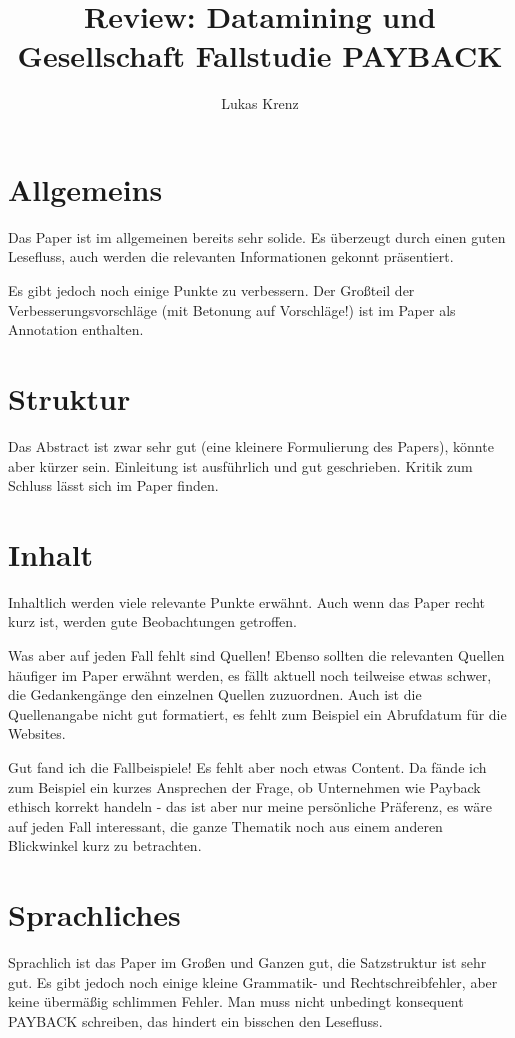 \documentclass{article}
\begin{document}
\title{Review: Datamining und Gesellschaft Fallstudie PAYBACK}
\author{Lukas Krenz}

\maketitle

\section{Allgemeins}
Das Paper ist im allgemeinen bereits sehr solide. Es überzeugt durch einen guten Lesefluss, auch werden die relevanten Informationen gekonnt präsentiert.

Es gibt jedoch noch einige Punkte zu verbessern. Der Großteil der Verbesserungsvorschläge (mit Betonung auf Vorschläge!) ist im Paper als Annotation enthalten.

\section{Struktur}
Das Abstract ist zwar sehr gut (eine kleinere Formulierung des Papers), könnte aber kürzer sein.
Einleitung ist ausführlich und gut geschrieben.
Kritik zum Schluss lässt sich im Paper finden.

\section{Inhalt}
Inhaltlich werden viele relevante Punkte erwähnt. Auch wenn das Paper recht kurz ist, werden gute Beobachtungen getroffen.

Was aber auf jeden Fall fehlt sind Quellen! Ebenso sollten die relevanten Quellen häufiger im Paper erwähnt werden, es fällt aktuell noch teilweise etwas schwer, die Gedankengänge den einzelnen Quellen zuzuordnen. Auch ist die Quellenangabe nicht gut formatiert, es fehlt zum Beispiel ein Abrufdatum für die Websites.

Gut fand ich die Fallbeispiele! Es fehlt aber noch etwas Content. Da fände ich zum Beispiel ein kurzes Ansprechen der Frage, ob Unternehmen wie Payback ethisch korrekt handeln - das ist aber nur meine persönliche Präferenz, es wäre auf jeden Fall interessant, die ganze Thematik noch aus einem anderen Blickwinkel kurz zu betrachten.

\section{Sprachliches}
Sprachlich ist das Paper im Großen und Ganzen gut, die Satzstruktur ist sehr gut. Es gibt jedoch noch einige kleine Grammatik- und Rechtschreibfehler, aber keine übermäßig schlimmen Fehler.
Man muss nicht unbedingt konsequent PAYBACK schreiben, das hindert ein bisschen den Lesefluss.
\end{document}
